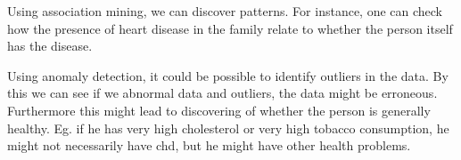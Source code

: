 Using association mining, we can discover patterns. For instance, one can check how the presence of heart disease in the family relate to whether the person itself has the disease.%

Using anomaly detection, it could be possible to identify outliers in the data. By this we can see if we abnormal data and outliers, the data might be erroneous. Furthermore this might lead to discovering of whether the person is generally healthy. Eg. if he has very high cholesterol or very high tobacco consumption, he might not necessarily have chd, but he might have other health problems.%

